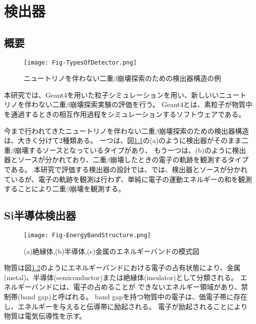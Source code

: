 \documentclass[a4paper,10pt]{jreport}
\begin{document}
\chapter{検出器}




\section{概要}

\begin{figure}[H]
	\center
	\texttt{[image: Fig-TypesOfDetector.png]}
	\caption{ニュートリノを伴わない二重$\beta$崩壊探索のための検出器構造の例} \label{Fig-TyepseOfDetector}
\end{figure}

本研究では、Geant4を用いた粒子シミュレーションを用い、新しいいニュートリノを伴わない二重$\beta$崩壊探索実験の評価を行う。
Geant4とは、素粒子が物質中を通過するときの相互作用過程をシミュレーションするソフトウェアである。

今まで行われてきたニュートリノを伴わない二重$\beta$崩壊探索のための検出器構造は、大きく分けて2種類ある。
一つは、図\ref{Fig-TyepseOfDetector}の(a)のように検出器がそのまま二重$\beta$崩壊するソースとなっているタイプがあり、
もう一つは、(b)のように検出器とソースが分かれており、二重$\beta$崩壊したときの電子の軌跡を観測するタイプである。
本研究で評価する検出器の設計では、では、検出器とソースが分かれているが、電子の軌跡を観測は行わず、単純に電子の運動エネルギーの和を観測することにより二重$\beta$崩壊を観測する。



\section{Si半導体検出器}

\begin{figure}[H]
	\center
	\texttt{[image: Fig-EnergyBandStructure.png]}
	\caption{(a)絶縁体,(b)半導体,(c)金属のエネルギーバンドの模式図\cite{TUS_text}} \label{Fig-SiliconSemiconductorDetector}
\end{figure}

物質は図\ref{Fig-SiliconSemiconductorDetector}のようにエネルギーバンドにおける電子の占有状態により、金属(metal)、半導体(semiconductor)または絶縁体(insulator)として分類される。
エネルギーバンドには、電子の占めることが できないエネルギー領域があり、禁制帯(band gap)と呼ばれる。
band gapを持つ物質中の電子は、価電子帯に存在し、エネルギーを与えると伝導帯に励起される。
電子が励起されることにより物質は電気伝導性を示す。
\end{document}
